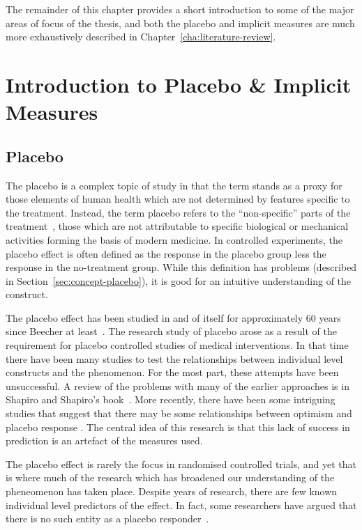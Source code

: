 The remainder of this chapter provides a short introduction to some of the major areas of focus of the thesis, and both the placebo and implicit measures are much more exhaustively described in Chapter~\ref{cha:literature-review}. 


\section{Introduction to Placebo \& Implicit Measures}
\label{sec:intr-plac-impl-meas}

\subsection{Placebo}
\label{sec:placebo}

The placebo is a complex topic of study in that the term stands as a proxy for those elements of human health which are not determined by  features specific to the treatment. Instead, the term placebo refers to the ``non-specific'' parts of the treatment~\cite{grunbaum1981placebo}, those which are not attributable to  specific biological or mechanical activities forming the basis of modern medicine. In controlled experiments, the placebo effect is often defined as the response in the placebo group less the response in the no-treatment group. While this definition has problems (described in Section~\ref{sec:concept-placebo}), it is good for an intuitive understanding of the construct. 

The placebo effect has been studied in and of itself for approximately 60 years since Beecher at least~\cite{beecher1955powerful}. The research study of placebo arose as a result of the requirement for placebo controlled studies of medical interventions. In that time there have been many studies to test the relationships between individual level constructs and the phenomenon. For the most part, these attempts have been unsuccessful. A review of the problems with many of the earlier approaches is in Shapiro and Shapiro's book~\cite{Shapiro1997}. More recently, there have been some intriguing studies that suggest that there may be some relationships between optimism and placebo response \cite{Geers2005,morton2009reproducibility}. The central idea of this research is that this lack of success in prediction is an artefact of the measures used. 

The placebo effect is rarely the focus in randomised controlled trials, and yet that is where much of the research which has broadened our understanding of the pheneomenon has taken place.
Despite years of research, there are few known individual level predictors of the effect. In fact, some researchers have argued that there is no such entity as a placebo responder~\cite{Kaptchuk2008a}. 


